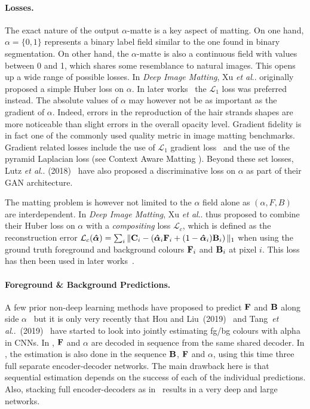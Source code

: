 \documentclass[runningheads]{llncs}
\makeatletter
\DeclareRobustCommand\onedot{\futurelet\@let@token\@onedot}
\def\@onedot{\ifx\@let@token.\else.\null\fi\xspace}
\def\etal{\emph{et al}\onedot}
\makeatother
\begin{document}
\paragraph{Losses.}

The exact nature of the output $\alpha$-matte is a key aspect of matting. On one
hand, $\alpha = \{0,1\}$ represents a binary label field similar to the one found
in binary segmentation. On other hand, the $\alpha$-matte is also a continuous
field with values between 0 and 1, which shares some resemblance to natural
images. This opens up a wide range of possible losses. In \textit{Deep Image
  Matting}, Xu \etal\cite{DeepImageMatting} originally proposed a simple Huber
loss on $\alpha$. In later works~\cite{DisentangledMatting,ContextMatting,GCAMatting} the $\mathcal{L}_1$ loss was
preferred instead. The absolute values of $\alpha$ may however not be as
important as the gradient of $\alpha$. Indeed, errors in the reproduction of the
hair strands shapes are more noticeable than slight errors in the overall
opacity level. Gradient fidelity is in fact one of the commonly used quality
metric in image matting benchmarks. Gradient related losses include the use of
$\mathcal{L}_1$ gradient loss~\cite{LearningBasedSamplingMatting} and the use of the pyramid Laplacian loss (see Context
Aware Matting \cite{ContextMatting}). Beyond these set losses, Lutz \etal
(2018)~\cite{AlphaGAN} have also proposed a discriminative loss on $\alpha$ as
part of their GAN architecture.

The matting problem is however not limited to the $\alpha$ field alone as
$(\alpha,F,B)$ are interdependent. In \textit{Deep Image Matting}, Xu
\etal\cite{DeepImageMatting} thus proposed to combine their Huber loss on
$\alpha$ with a \textit{compositing} loss $\mathcal{L}_c$, which is defined as the
reconstruction error $\mathcal{L}_c(\bm{\hat{\alpha}}) = \sum_i \| \mathbf{C}_i - \left(\bm{\hat{\alpha}}_i \mathbf{{{F}}}_i +
(1-\bm{\hat{\alpha}}_i) \mathbf{{{B}}}_i \right)\|_1$ when using the ground truth foreground and
background colours $\mathbf{{{F}}}_i$ and $\mathbf{{{B}}}_i$ at pixel $i$. This loss has then
been used in later works~\cite{AlphaGAN,LearningBasedSamplingMatting,VDRNMatting}. 
\paragraph{Foreground \& Background Predictions.}

A few prior non-deep learning methods have proposed to predict $\mathbf{{{F}}}$ and
$\mathbf{{{B}}}$ along side $\alpha$~\cite{SimultaneousMatting,sharedMatting,IfmMatting} but it
is only very recently that Hou and Liu~(2019)~\cite{ContextMatting} and
Tang~\etal~(2019)~\cite{LearningBasedSamplingMatting} have started to look into
jointly estimating fg/bg colours with alpha in CNNs. In \cite{ContextMatting},
 $\mathbf{{{F}}}$ and $\alpha$ are decoded in sequence from the same shared decoder. In
\cite{LearningBasedSamplingMatting}, the estimation is also done in the sequence
$\mathbf{{{B}}}$, $\mathbf{{{F}}}$ and $\alpha$, using this time three full separate encoder-decoder
networks. The main drawback here is that sequential estimation
depends on the success of each of the individual predictions. Also, stacking
full encoder-decoders as in~\cite{LearningBasedSamplingMatting} results in a
very deep and large networks.
\end{document}
